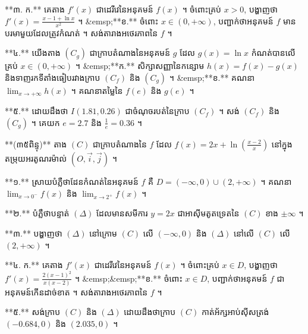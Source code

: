 **៣. ក.** គេតាង $f'(x)$ ជាដេរីវេនៃអនុគមន៍ $f(x)$ ។ ចំពោះគ្រប់ $x > 0$, បង្ហាញថា $f'(x) = \frac{x - 1 + \ln x}{x^2}$ ។
&emsp;**ខ.** ចំពោះ $x \in (0, +\infty)$, បញ្ជាក់ថាអនុគមន៍ $f$ មានបរមាមួយដែលត្រូវកំណត់ ។ សង់តារាងអថេរភាពនៃ $f$ ។

**៤.** យើងតាង $(C_g)$ ជាក្រាបតំណាងនៃអនុគមន៍ $g$ ដែល $g(x) = \ln x$ កំណត់បានលើគ្រប់ $x \in (0, +\infty)$ ។
&emsp;**ក.** សិក្សាសញ្ញានៃកន្សោម $h(x) = f(x) - g(x)$ និងទាញរកទីតាំងធៀបរវាងក្រាប $(C_f)$ និង $(C_g)$ ។
&emsp;**ខ.** គណនា $\lim_{x \to +\infty} h(x)$ ។ គណនាតម្លៃនៃ $f(e)$ និង $g(e)$ ។

**៥.** ដោយដឹងថា $I(1.81, 0.26)$ ជាចំណុចរបត់នៃក្រាប $(C_f)$ ។ សង់ $(C_f)$ និង $(C_g)$ ។ គេយក $e = 2.7$ និង $\frac{1}{e} = 0.36$ ។



**(៣៥ពិន្ទុ)** តាង $(C)$ ជាក្រាបតំណាងនៃ $f$ ដែល $f(x) = 2x + \ln\left(\frac{x-2}{x}\right)$ នៅក្នុងតម្រុយអរតូណរម៉ាល់ $(O, \vec{i}, \vec{j})$ ។

**១.** ស្រាយបំភ្លឺថាដែនកំណត់នៃអនុគមន៍ $f$ គឺ $D = (-\infty, 0) \cup (2, +\infty)$ ។ គណនា $\lim_{x \to 0^-} f(x)$ និង $\lim_{x \to 2^+} f(x)$ ។

**២.** បំភ្លឺថាបន្ទាត់ $(\Delta)$ ដែលមានសមីការ $y = 2x$ ជាអាស៊ីមតូតទ្រេតនៃ $(C)$ ខាង $\pm\infty$ ។

**៣.** បង្ហាញថា $(\Delta)$ នៅក្រោម $(C)$ លើ $(-\infty, 0)$ និង $(\Delta)$ នៅលើ $(C)$ លើ $(2, +\infty)$ ។

**៤. ក.** គេតាង $f'(x)$ ជាដេរីវេនៃអនុគមន៍ $f(x)$ ។ ចំពោះគ្រប់ $x \in D$, បង្ហាញថា $f'(x) = \frac{2(x-1)^2}{x(x-2)}$ ។
&emsp;&emsp;**ខ.** ចំពោះ $x \in D$, បញ្ជាក់ថាអនុគមន៍ $f$ ជាអនុគមន៍កើនដាច់ខាត ។ សង់តារាងអថេរភាពនៃ $f$ ។

**៥.** សង់ក្រាប $(C)$ និង $(\Delta)$ ដោយដឹងថាក្រាប $(C)$ កាត់អ័ក្សអាប់ស៊ីសត្រង់ $(-0.684, 0)$ និង $(2.035, 0)$ ។